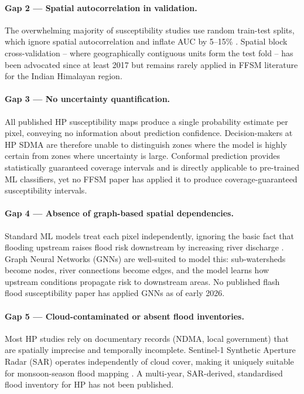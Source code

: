 \paragraph{Gap 2 --- Spatial autocorrelation in validation.}
The overwhelming majority of susceptibility studies use random train-test splits,
which ignore spatial autocorrelation and inflate AUC by 5--15\%
\citep{valavi2019, roberts2017cross}.
Spatial block cross-validation -- where geographically contiguous units form the test fold --
has been advocated since at least 2017 but remains rarely applied in FFSM literature
for the Indian Himalayan region.

\paragraph{Gap 3 --- No uncertainty quantification.}
All published HP susceptibility maps produce a single probability estimate per pixel,
conveying no information about prediction confidence.
Decision-makers at HP SDMA are therefore unable to distinguish zones where
the model is highly certain from zones where uncertainty is large.
Conformal prediction \citep{angelopoulos2023conformal} provides
statistically guaranteed coverage intervals and is directly applicable to
pre-trained ML classifiers, yet no FFSM paper has applied it to produce
coverage-guaranteed susceptibility intervals.

\paragraph{Gap 4 --- Absence of graph-based spatial dependencies.}
Standard ML models treat each pixel independently, ignoring the basic fact that
flooding upstream raises flood risk downstream by increasing river discharge
\citep{bentivoglio2022review}.
Graph Neural Networks (GNNs) are well-suited to model this: sub-watersheds become
nodes, river connections become edges, and the model learns how upstream conditions
propagate risk to downstream areas.
No published flash flood susceptibility paper has applied GNNs as of early 2026.

\paragraph{Gap 5 --- Cloud-contaminated or absent flood inventories.}
Most HP studies rely on documentary records (NDMA, local government) that are
spatially imprecise and temporally incomplete.
Sentinel-1 Synthetic Aperture Radar (SAR) operates independently of cloud cover,
making it uniquely suitable for monsoon-season flood mapping
\citep{nagamani2024sar}.
A multi-year, SAR-derived, standardised flood inventory for HP has not been published.


